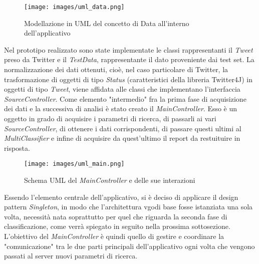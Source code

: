 \begin{figure}[h!]
    \centering
    \texttt{[image: images/uml\_data.png]}
    \caption{Modellazione in UML del concetto di Data all'interno dell'applicativo}
    \label{fig:my_label}
\end{figure}

Nel prototipo realizzato sono state implementate le classi rappresentanti il \textit{Tweet} preso da Twitter e il \textit{TestData}, rappresentante il dato proveniente dai test set. La normalizzazione dei dati ottenuti,  cioè, nel caso particolare di Twitter, la trasformazione di oggetti di tipo \textit{Status} (caratteristici della libreria Twitter4J) in oggetti di tipo \textit{Tweet}, viene affidata alle classi che implementano l'interfaccia \textit{SourceController}.  \newline 
Come elemento "intermedio" fra la prima fase di acquisizione dei dati e la successiva di analisi è stato creato il \textit{MainController}. Esso è un oggetto in grado di acquisire i parametri di ricerca, di passarli ai vari \textit{SourceController}, di ottenere i dati corrispondenti, di passare questi ultimi al \textit{MultiClassifier} e infine di acquisire da quest'ultimo il report da restuituire in risposta. 

\begin{figure}[h!]
    \centering
    \texttt{[image: images/uml\_main.png]}
    \caption{Schema UML del \textit{MainController} e delle sue interazioni}
    \label{fig:uml_main}
\end{figure}
Essendo l'elemento centrale dell'applicativo, si è deciso di applicare il design pattern \textit{Singleton}, in modo che l'architettura vgodi base fosse istanziata una sola volta, necessità nata soprattutto per quel che riguarda la seconda fase di classificazione, come verrà spiegato in seguito nella prossima sottosezione. L'obiettivo del \textit{MainController} è quindi quello di gestire e coordinare la "comunicazione" tra le due parti principali dell'applicativo ogni volta che vengono passati al server nuovi parametri di ricerca. 

